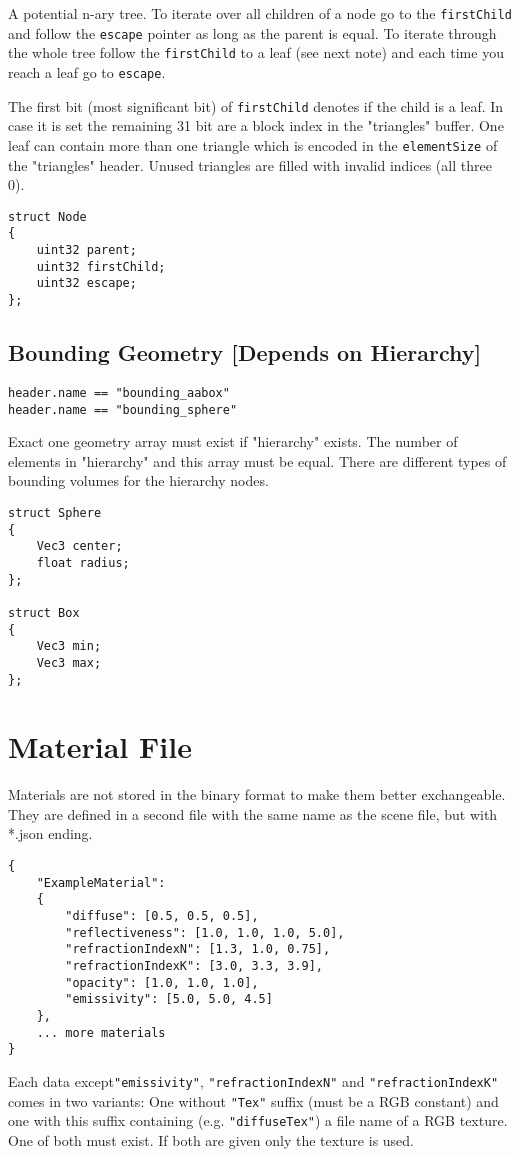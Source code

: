 \documentclass[english,10pt,a4paper,twocolumn,colorscheme=green]{orarticle}
\begin{document}
	A potential n-ary tree. To iterate over all children of a node go to the \lstinline|firstChild| and follow the \lstinline|escape| pointer as long as the parent is equal. To iterate through the whole tree follow the \lstinline|firstChild| to a leaf (see next note) and each time you reach a leaf go to \lstinline|escape|.
	
	The first bit (most significant bit) of \lstinline|firstChild| denotes if the child is a leaf. In case it is set the remaining 31 bit are a block index in the "triangles" buffer. One leaf can contain more than one triangle which is encoded in the \lstinline|elementSize| of the "triangles" header. Unused triangles are filled with invalid indices (all three 0).
	\begin{lstlisting}
struct Node
{
	uint32 parent;
	uint32 firstChild;
	uint32 escape;
};
	\end{lstlisting}
	
	\subsection{Bounding Geometry [Depends on Hierarchy]}
	\lstinline|header.name == "bounding_aabox"|\\
	\lstinline|header.name == "bounding_sphere"|
	
	Exact one geometry array must exist if "hierarchy" exists. The number of elements in "hierarchy" and this array must be equal. There are different types of bounding volumes for the hierarchy nodes.
	\begin{lstlisting}
struct Sphere
{
	Vec3 center;
	float radius;
};

struct Box
{
	Vec3 min;
	Vec3 max;
};
	\end{lstlisting}
	
	
		
	\section{Material File}
	\label{sec:materialjson}
	Materials are not stored in the binary format to make them better exchangeable. They are defined in a second file with the same name as the scene file, but with *.json ending.
	\begin{lstlisting}
{
  	"ExampleMaterial": 
  	{
		"diffuse": [0.5, 0.5, 0.5],
		"reflectiveness": [1.0, 1.0, 1.0, 5.0],
		"refractionIndexN": [1.3, 1.0, 0.75],
		"refractionIndexK": [3.0, 3.3, 3.9],
		"opacity": [1.0, 1.0, 1.0],
		"emissivity": [5.0, 5.0, 4.5]
  	},		
	... more materials
}
	\end{lstlisting}
	Each data except\lstinline|"emissivity"|, \lstinline|"refractionIndexN"| and \lstinline|"refractionIndexK"| comes in two variants: One without \lstinline|"Tex"| suffix (must be a RGB constant) and one with this suffix containing (e.g. \lstinline|"diffuseTex"|) a file name of a RGB texture. One of both must exist. If both are given only the texture is used.
	
\end{document}
